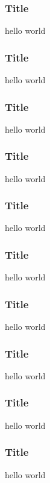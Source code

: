 \documentclass[12pt]{beamer}
\begin{document}
\begin{frame}
\frametitle{Title}
hello world
\end{frame}

\begin{frame}
\frametitle{Title}
hello world
\end{frame}

\begin{frame}
\frametitle{Title}
hello world
\end{frame}

\begin{frame}
\frametitle{Title}
hello world
\end{frame}

\begin{frame}
\frametitle{Title}
hello world
\end{frame}

\begin{frame}
\frametitle{Title}
hello world
\end{frame}

\begin{frame}
\frametitle{Title}
hello world
\end{frame}

\begin{frame}
\frametitle{Title}
hello world
\end{frame}

\begin{frame}
\frametitle{Title}
hello world
\end{frame}

\begin{frame}
\frametitle{Title}
hello world
\end{frame}

%
%
\end{document}
